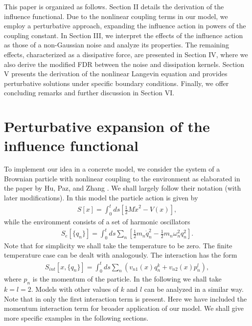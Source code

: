 \documentclass[%
amssymb,preprint,preprintnumbers,nofootinbib,superscriptaddress]{revtex4}
\begin{document}
This paper is organized as follows.  {Section II details the derivation of the influence functional. Due to the nonlinear coupling terms in our model, we employ a perturbative approach, expanding the influence action in powers of the coupling constant. In Section III, we interpret the effects of the influence action as those of a non-Gaussian noise and analyze its properties. The remaining effects, characterized as a dissipative force, are presented in Section IV, where we also derive the modified FDR between the noise and dissipation kernels. Section V presents the derivation of the nonlinear Langevin equation and provides perturbative solutions under specific boundary conditions. Finally, we offer concluding remarks and further discussion in Section VI.} 

 
\section{Perturbative expansion of the influence functional}\label{sec:perturb}

To implement our idea in a concrete model, we consider the system of a Brownian particle with nonlinear coupling to the environment as elaborated in the paper by Hu, Paz, and Zhang \cite{HPZ93}. We shall largely follow their notation (with later modifications). In this model the particle action is given by
\begin{eqnarray}
S[x]=\int_{0}^{t}ds\left[\frac{1}{2}M\dot{x}^{2}-V(x)\right],
\end{eqnarray}
while the environment consists of a set of harmonic oscillators
\begin{eqnarray}
S_{e}[\{q_{n}\}]=\int_{0}^{t}ds\sum_{n}\left[\frac{1}{2}m_{n}\dot{q}_{n}^{2}-\frac{1}{2}m_{n}\omega_{n}^{2}q_{n}^{2}\right].
\end{eqnarray}
Note that for simplicity we shall take the temperature to be zero. The finite temperature case can be dealt with analogously. The interaction has the form
\begin{eqnarray}\label{Sint}
S_{int}[x,\{q_{n}\}]=\int_{0}^{t}ds\sum_{n}\left(v_{n1}(x)q_{n}^{k}+v_{n2}(x)p_{n}^{l}\right),
\end{eqnarray}
where $p_{n}$ is the momentum of the particle. In the following we shall take $k=l=2$. Models with other values of $k$ and $l$ can be analyzed in a similar way. Note that in \cite{HPZ93} only the first interaction term is present. Here we have included the momentum interaction term for broader application of our model. We shall give more specific examples in the following sections.
\end{document}
